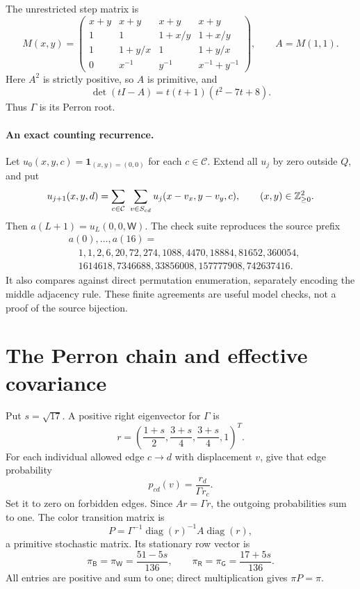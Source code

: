 \documentclass[11pt,letterpaper]{article}
\newcommand{\one}{\mathbf 1}\newcommand{\ii}{\mathrm i}
\newcommand{\diag}{\operatorname{diag}}\newcommand{\rad}{\operatorname{rad}}
\newcommand{\G}{\Gamma}\newcommand{\s}{\sqrt{17}}
\newcommand{\B}{\mathsf B}\newcommand{\RR}{\mathsf R}\newcommand{\GG}{\mathsf G}\newcommand{\W}{\mathsf W}
\numberwithin{equation}{section}
\begin{document}
The unrestricted step matrix is
\begin{equation}\label{osr:eq:matrix}
 M(x,y)=\begin{pmatrix}
 x+y&x+y&x+y&x+y\\
 1&1&1+x/y&1+x/y\\
 1&1+y/x&1&1+y/x\\
 0&x^{-1}&y^{-1}&x^{-1}+y^{-1}
 \end{pmatrix},\qquad A=M(1,1).
\end{equation}
Here $A^2$ is strictly positive, so $A$ is primitive, and
\[
 \det(tI-A)=t(t+1)(t^2-7t+8).
\]
Thus $\G$ is its Perron root.

\paragraph{An exact counting recurrence.}
Let $u_0(x,y,c)=\one_{(x,y)=(0,0)}$ for each $c\in\mathcal C$. Extend all $u_j$ by zero outside $Q$, and put
\begin{equation}\label{osr:eq:recurrence}
 u_{j+1}(x,y,d)=\sum_{c\in\mathcal C}\ \sum_{v\in S_{cd}}
                      u_j(x-v_x,y-v_y,c),\qquad (x,y)\in\mathbb Z_{\ge0}^2.
\end{equation}
Then $a(L+1)=u_L(0,0,\W)$. The check suite reproduces the source prefix
\begin{align*}
&a(0),\ldots,a(16)=\\
&\quad 1,1,2,6,20,72,274,1088,4470,18884,81652,360054,\\
&\quad 1614618,7346688,33856008,157777908,742637416.
\end{align*}
It also compares against direct permutation enumeration, separately encoding the middle adjacency rule. These finite agreements are useful model checks, not a proof of the source bijection.

\section{The Perron chain and effective covariance}\label{osr:sec:perron}
Put $s=\sqrt{17}$. A positive right eigenvector for $\G$ is
\begin{equation}\label{osr:eq:r}
 r=\left(\frac{1+s}{2},\frac{3+s}{4},\frac{3+s}{4},1\right)^{\!T}.
\end{equation}
For each individual allowed edge $c\to d$ with displacement $v$, give that edge probability
\begin{equation}\label{osr:eq:edgeprob}
 p_{cd}(v)=\frac{r_d}{\G r_c}.
\end{equation}
Set it to zero on forbidden edges. Since $Ar=\G r$, the outgoing probabilities sum to one. The color transition matrix is
\[
 P=\G^{-1}\diag(r)^{-1}A\diag(r),
\]
a primitive stochastic matrix. Its stationary row vector is
\begin{equation}\label{osr:eq:stationary}
 \pi_\B=\pi_\W=\frac{51-5s}{136},\qquad
 \pi_\RR=\pi_\GG=\frac{17+5s}{136}.
\end{equation}
All entries are positive and sum to one; direct multiplication gives $\pi P=\pi$.
\end{document}
